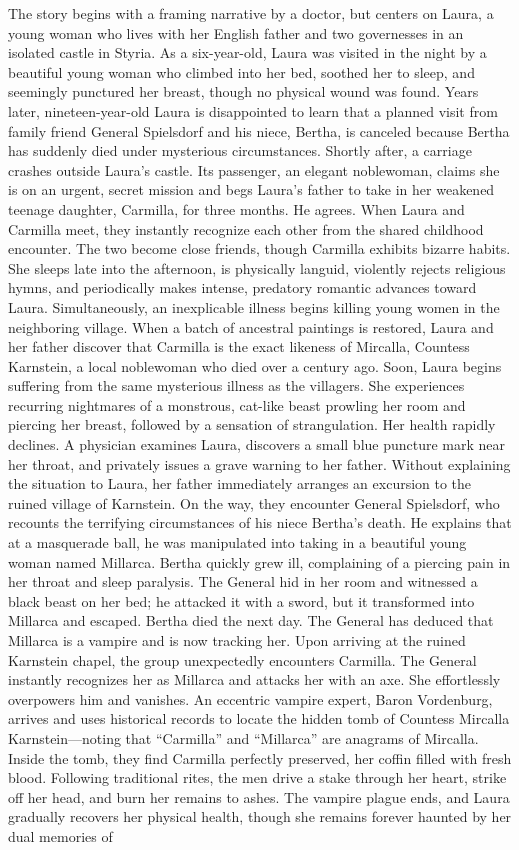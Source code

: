 \documentclass{article} %
\begin{document}
The story begins with a framing narrative by a doctor, but centers on Laura, a young woman who lives with her English father and two governesses in an isolated castle in Styria. As a six-year-old, Laura was visited in the night by a beautiful young woman who climbed into her bed, soothed her to sleep, and seemingly punctured her breast, though no physical wound was found. Years later, nineteen-year-old Laura is disappointed to learn that a planned visit from family friend General Spielsdorf and his niece, Bertha, is canceled because Bertha has suddenly died under mysterious circumstances. Shortly after, a carriage crashes outside Laura's castle. Its passenger, an elegant noblewoman, claims she is on an urgent, secret mission and begs Laura's father to take in her weakened teenage daughter, Carmilla, for three months. He agrees. When Laura and Carmilla meet, they instantly recognize each other from the shared childhood encounter. The two become close friends, though Carmilla exhibits bizarre habits. She sleeps late into the afternoon, is physically languid, violently rejects religious hymns, and periodically makes intense, predatory romantic advances toward Laura. Simultaneously, an inexplicable illness begins killing young women in the neighboring village. When a batch of ancestral paintings is restored, Laura and her father discover that Carmilla is the exact likeness of Mircalla, Countess Karnstein, a local noblewoman who died over a century ago. Soon, Laura begins suffering from the same mysterious illness as the villagers. She experiences recurring nightmares of a monstrous, cat-like beast prowling her room and piercing her breast, followed by a sensation of strangulation. Her health rapidly declines. A physician examines Laura, discovers a small blue puncture mark near her throat, and privately issues a grave warning to her father. Without explaining the situation to Laura, her father immediately arranges an excursion to the ruined village of Karnstein. On the way, they encounter General Spielsdorf, who recounts the terrifying circumstances of his niece Bertha's death. He explains that at a masquerade ball, he was manipulated into taking in a beautiful young woman named Millarca. Bertha quickly grew ill, complaining of a piercing pain in her throat and sleep paralysis. The General hid in her room and witnessed a black beast on her bed; he attacked it with a sword, but it transformed into Millarca and escaped. Bertha died the next day. The General has deduced that Millarca is a vampire and is now tracking her. Upon arriving at the ruined Karnstein chapel, the group unexpectedly encounters Carmilla. The General instantly recognizes her as Millarca and attacks her with an axe. She effortlessly overpowers him and vanishes. An eccentric vampire expert, Baron Vordenburg, arrives and uses historical records to locate the hidden tomb of Countess Mircalla Karnstein—noting that ``Carmilla'' and ``Millarca'' are anagrams of Mircalla. Inside the tomb, they find Carmilla perfectly preserved, her coffin filled with fresh blood. Following traditional rites, the men drive a stake through her heart, strike off her head, and burn her remains to ashes. The vampire plague ends, and Laura gradually recovers her physical health, though she remains forever haunted by her dual memories of 
\end{document}
